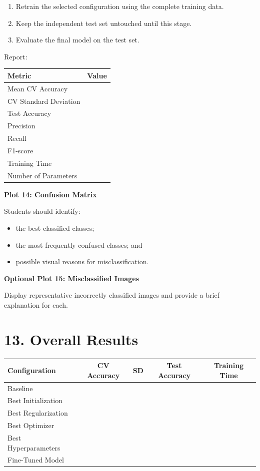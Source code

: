 \documentclass[10pt]{article}
\begin{document}
\begin{enumerate}
\item Retrain the selected configuration using the complete training data.
\item Keep the independent test set untouched until this stage.
\item Evaluate the final model on the test set.
\end{enumerate}

Report:

\begin{center}
\begin{tabular}{|l|c|}
\hline
Metric & Value\\
\hline
Mean CV Accuracy &\\
CV Standard Deviation &\\
Test Accuracy &\\
Precision &\\
Recall &\\
F1-score &\\
Training Time &\\
Number of Parameters &\\
\hline
\end{tabular}
\end{center}

\textbf{Plot 14: Confusion Matrix}

Students should identify:

\begin{itemize}
\item the best classified classes;
\item the most frequently confused classes; and
\item possible visual reasons for misclassification.
\end{itemize}

\textbf{Optional Plot 15: Misclassified Images}

Display representative incorrectly classified images and provide a
brief explanation for each.

\section*{13. Overall Results}

\begin{center}
\begin{tabular}{|l|c|c|c|c|}
\hline
Configuration & CV Accuracy & SD & Test Accuracy & Training Time\\
\hline
Baseline & & & &\\
Best Initialization & & & &\\
Best Regularization & & & &\\
Best Optimizer & & & &\\
Best Hyperparameters & & & &\\
Fine-Tuned Model & & & &\\
\hline
\end{tabular}
\end{center}
\end{document}
